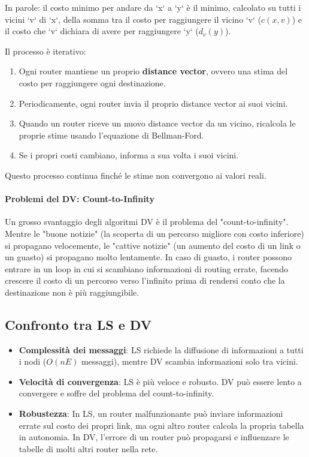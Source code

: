In parole: il costo minimo per andare da `x` a `y` è il minimo, calcolato su tutti i vicini `v` di `x`, della somma tra il costo per raggiungere il vicino `v` ($c(x,v)$) e il costo che `v` dichiara di avere per raggiungere `y` ($d_v(y)$).

Il processo è iterativo:
\begin{enumerate}
    \item Ogni router mantiene un proprio \textbf{distance vector}, ovvero una stima del costo per raggiungere ogni destinazione.
    \item Periodicamente, ogni router invia il proprio distance vector ai suoi vicini.
    \item Quando un router riceve un nuovo distance vector da un vicino, ricalcola le proprie stime usando l'equazione di Bellman-Ford.
    \item Se i propri costi cambiano, informa a sua volta i suoi vicini.
\end{enumerate}

Questo processo continua finché le stime non convergono ai valori reali.

\paragraph{Problemi del DV: Count-to-Infinity}
Un grosso svantaggio degli algoritmi DV è il problema del "count-to-infinity". Mentre le "buone notizie" (la scoperta di un percorso migliore con costo inferiore) si propagano velocemente, le "cattive notizie" (un aumento del costo di un link o un guasto) si propagano molto lentamente. In caso di guasto, i router possono entrare in un loop in cui si scambiano informazioni di routing errate, facendo crescere il costo di un percorso verso l'infinito prima di rendersi conto che la destinazione non è più raggiungibile.

\subsection{Confronto tra LS e DV}
\begin{itemize}
    \item \textbf{Complessità dei messaggi}: LS richiede la diffusione di informazioni a tutti i nodi ($O(nE)$ messaggi), mentre DV scambia informazioni solo tra vicini.
    \item \textbf{Velocità di convergenza}: LS è più veloce e robusto. DV può essere lento a convergere e soffre del problema del count-to-infinity.
    \item \textbf{Robustezza}: In LS, un router malfunzionante può inviare informazioni errate sul costo dei propri link, ma ogni altro router calcola la propria tabella in autonomia. In DV, l'errore di un router può propagarsi e influenzare le tabelle di molti altri router nella rete.
\end{itemize}

